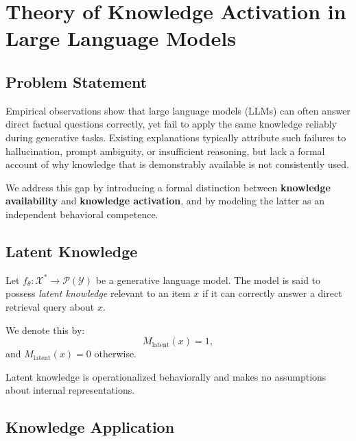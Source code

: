 
\section{Theory of Knowledge Activation in Large Language Models}

\subsection{Problem Statement}

Empirical observations show that large language models (LLMs) can often answer direct factual questions correctly, yet fail to apply the same knowledge reliably during generative tasks. Existing explanations typically attribute such failures to hallucination, prompt ambiguity, or insufficient reasoning, but lack a formal account of why knowledge that is demonstrably available is not consistently used.

We address this gap by introducing a formal distinction between \textbf{knowledge availability} and \textbf{knowledge activation}, and by modeling the latter as an independent behavioral competence.


\subsection{Latent Knowledge}

\begin{definition}
Let $f_\theta : \mathcal{X}^* \rightarrow \mathcal{P}(\mathcal{Y})$ be a generative language model. The model is said to possess \emph{latent knowledge} relevant to an item $x$ if it can correctly answer a direct retrieval query about $x$.

We denote this by:
\[
M_{\text{latent}}(x) = 1,
\]
and $M_{\text{latent}}(x) = 0$ otherwise.
\end{definition}

Latent knowledge is operationalized behaviorally and makes no assumptions about internal representations.


\subsection{Knowledge Application}

